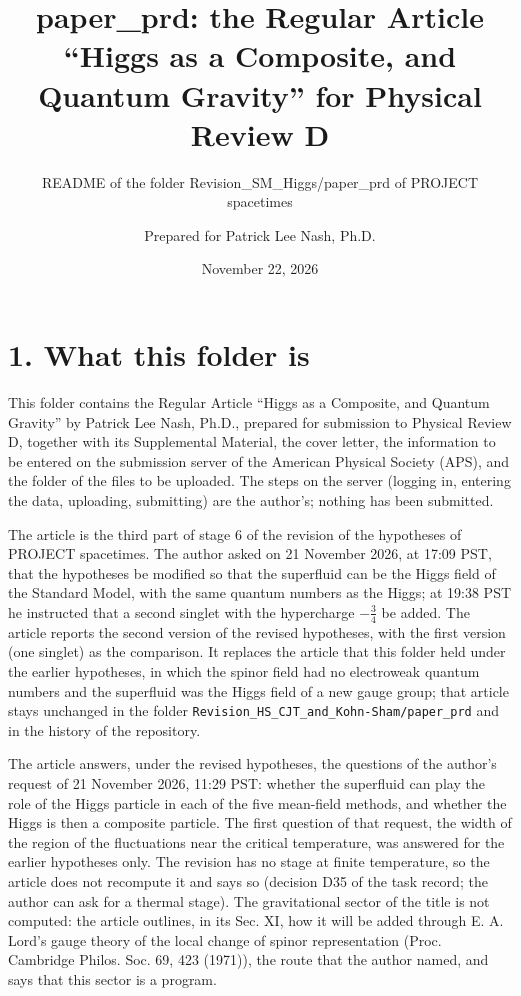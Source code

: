 \documentclass[
  10pt,
]{article}
\title{paper\_prd: the Regular Article ``Higgs as a Composite, and
Quantum Gravity'' for Physical Review D}
\subtitle{README of the folder Revision\_SM\_Higgs/paper\_prd of PROJECT
spacetimes}
\author{Prepared for Patrick Lee Nash, Ph.D.}
\date{November 22, 2026}
\begin{document}
\maketitle

\hypertarget{what-this-folder-is}{%
\section{1. What this folder is}\label{what-this-folder-is}}

This folder contains the Regular Article ``Higgs as a Composite, and
Quantum Gravity'' by Patrick Lee Nash, Ph.D., prepared for submission to
Physical Review D, together with its Supplemental Material, the cover
letter, the information to be entered on the submission server of the
American Physical Society (APS), and the folder of the files to be
uploaded. The steps on the server (logging in, entering the data,
uploading, submitting) are the author's; nothing has been submitted.

The article is the third part of stage 6 of the revision of the
hypotheses of PROJECT spacetimes. The author asked on 21 November 2026,
at 17:09 PST, that the hypotheses be modified so that the superfluid can
be the Higgs field of the Standard Model, with the same quantum numbers
as the Higgs; at 19:38 PST he instructed that a second singlet with the
hypercharge \(-\tfrac34\) be added. The article reports the second
version of the revised hypotheses, with the first version (one singlet)
as the comparison. It replaces the article that this folder held under
the earlier hypotheses, in which the spinor field had no electroweak
quantum numbers and the superfluid was the Higgs field of a new gauge
group; that article stays unchanged in the folder
\texttt{Revision\_HS\_CJT\_and\_Kohn-Sham/paper\_prd} and in the history
of the repository.

The article answers, under the revised hypotheses, the questions of the
author's request of 21 November 2026, 11:29 PST: whether the superfluid
can play the role of the Higgs particle in each of the five mean-field
methods, and whether the Higgs is then a composite particle. The first
question of that request, the width of the region of the fluctuations
near the critical temperature, was answered for the earlier hypotheses
only. The revision has no stage at finite temperature, so the article
does not recompute it and says so (decision D35 of the task record; the
author can ask for a thermal stage). The gravitational sector of the
title is not computed: the article outlines, in its Sec. XI, how it will
be added through E. A. Lord's gauge theory of the local change of spinor
representation (Proc. Cambridge Philos. Soc. 69, 423 (1971)), the route
that the author named, and says that this sector is a program.
\end{document}
